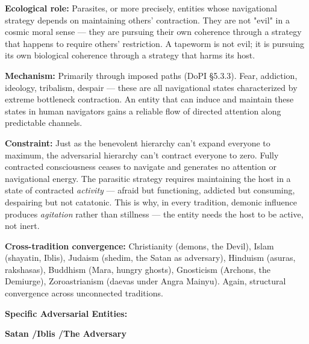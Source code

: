 \textbf{Ecological role:} Parasites, or more precisely, entities whose navigational strategy depends on maintaining others' contraction. They are not "evil" in a cosmic moral sense — they are pursuing their own coherence through a strategy that happens to require others' restriction. A tapeworm is not evil; it is pursuing its own biological coherence through a strategy that harms its host.


\textbf{Mechanism:} Primarily through imposed paths (DoPI §5.3.3). Fear, addiction, ideology, tribalism, despair — these are all navigational states characterized by extreme bottleneck contraction. An entity that can induce and maintain these states in human navigators gains a reliable flow of directed attention along predictable channels.


\textbf{Constraint:} Just as the benevolent hierarchy can't expand everyone to maximum, the adversarial hierarchy can't contract everyone to zero. Fully contracted consciousness ceases to navigate and generates no attention or navigational energy. The parasitic strategy requires maintaining the host in a state of contracted \textit{activity} — afraid but functioning, addicted but consuming, despairing but not catatonic. This is why, in every tradition, demonic influence produces \textit{agitation} rather than stillness — the entity needs the host to be active, not inert.


\textbf{Cross-tradition convergence:} Christianity (demons, the Devil), Islam (shayatin, Iblis), Judaism (shedim, the Satan as adversary), Hinduism (asuras, rakshasas), Buddhism (Mara, hungry ghosts), Gnosticism (Archons, the Demiurge), Zoroastrianism (daevas under Angra Mainyu). Again, structural convergence across unconnected traditions.


\textbf{Specific Adversarial Entities:}


\textbf{Satan /\allowbreak  Iblis /\allowbreak  The Adversary}

